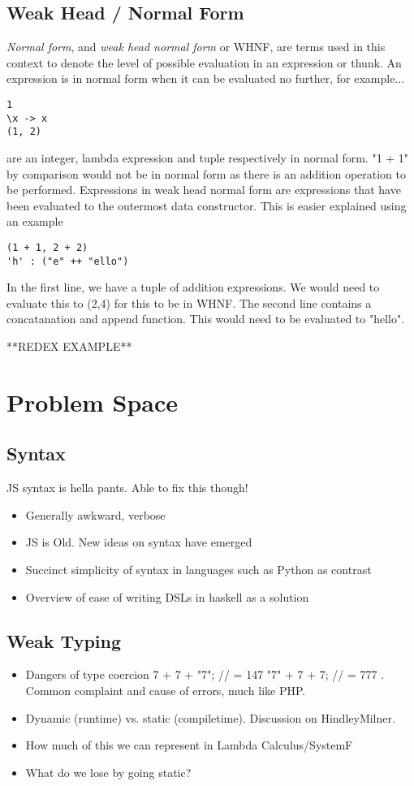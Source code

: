 \documentclass[11pt]{article}
\begin{document}
\subsection{Weak Head / Normal Form}
\emph{Normal form}, and \emph{weak head normal form} or WHNF, are terms used
in this context to denote the level of possible evaluation in an expression
or thunk. An expression is in normal form when it can be evaluated no further,
for example...
\begin{verbatim}
1
\x -> x
(1, 2)
\end{verbatim}
are an integer, lambda expression and tuple respectively in normal form. "1 + 1"
by comparison would not be in normal form as there is an addition operation to
be performed.
Expressions in weak head normal form are expressions that have been evaluated
to the outermost data constructor. This is easier explained using an example
\begin{verbatim}
(1 + 1, 2 + 2)
'h' : ("e" ++ "ello")
\end{verbatim}

In the first line, we have a tuple of addition expressions. We would need to
evaluate this to (2,4) for this to be in WHNF. The second line contains a
concatanation and append function. This would need to be evaluated to "hello".

**REDEX EXAMPLE**

\section{Problem Space}

\subsection{Syntax}
JS syntax is hella pants. Able to fix this though!
\begin{itemize}
\item Generally awkward, verbose
\item JS is Old. New ideas on syntax have emerged
\item Succinct simplicity of syntax in languages such as Python as contrast
\item Overview of ease of writing DSLs in haskell as a solution
\end{itemize}


\subsection{Weak Typing}
\begin{itemize}
\item Dangers of type coercion 7 + 7 + "7"; // = 147  "7" + 7 + 7; // = 777 . 
	  Common complaint and cause of errors, much like PHP.
\item Dynamic (runtime) vs. static (compiletime). Discussion on HindleyMilner.
\item How much of this we can represent in Lambda Calculus/SystemF
\item What do we lose by going static?
\end{itemize}
\end{document}
